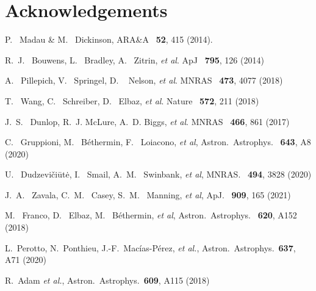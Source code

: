 \documentclass{webofc}
\begin{document}

\section*{Acknowledgements}


%
% 
%
%
\begin{thebibliography}{}
%
%

%
 P. ~Madau \& M. ~Dickinson, 
ARA\&A \ {\bf 52}, 415 (2014).

 R.~J. ~Bouwens, L. ~Bradley, A. ~Zitrin, {\it et al}. ApJ \ {\bf 795}, 126 (2014)


  A. ~Pillepich, V. ~Springel, D. ~ Nelson, {\it et al}.
MNRAS \ {\bf 473}, 4077 (2018)

  T. ~Wang,  C. ~Schreiber, D. ~Elbaz, {\it et al}.
Nature \  {\bf 572}, 211 (2018)

  J.~S. ~Dunlop,  R.~J. McLure, A.~D. Biggs, {\it et al}.
MNRAS \  {\bf 466}, 861 (2017)

  C. ~Gruppioni, M. ~B{\'e}thermin,  F. ~Loiacono, {\it et al},
Astron.\ Astrophys. \ {\bf 643}, A8 (2020)

  U. ~Dudzevi{\v{c}}i{\={u}}t{\.{e}}, I. ~Smail, A.~M. ~Swinbank, {\it et al},
MNRAS. \ {\bf 494}, 3828 (2020)

  J.~A. ~Zavala, C.~M. ~Casey,  S.~M. ~Manning, {\it et al},
ApJ. \ {\bf 909}, 165 (2021)

 M. ~Franco, D. ~Elbaz, M. ~B{\'e}thermin, {\it et al},
Astron.\ Astrophys. \ {\bf 620}, A152 (2018)

  L.~Perotto, N.~Ponthieu, J.-F.~Mac\'ias-P\'erez, {\it et al.},
  Astron.\ Astrophys.\  {\bf 637}, A71 (2020)

R.~Adam {\it et al.},
  Astron.\ Astrophys.\  {\bf 609}, A115 (2018)


\end{thebibliography}
\end{document}
